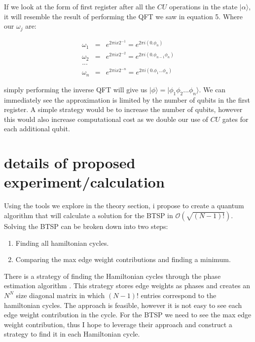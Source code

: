 \documentclass[twocolumn,showpacs,preprintnumbers,amsmath,amssymb]{revtex4}
\begin{document}
		If we look at the form of first register after all the $CU$ operations in the state $|\alpha\rangle$, it will resemble the result of performing the QFT we saw in equation 5. Where our $\omega_j$ are:
		
		\begin{eqnarray*}
			\omega_1 &=& e^{2\pi i x 2^{-1}} =  e^{2\pi i (0.\phi_n)}\\
			\omega_2 &=& e^{2\pi i x 2^{-2}} =  e^{2\pi i (0.\phi_{n-1}\phi_n)}\\
			...\\
			\omega_n &=& e^{2\pi i x 2^{-n}} =  e^{2\pi i (0.\phi_1...\phi_n)}
		\end{eqnarray*}
		
		simply performing the inverse QFT will give us $|\phi\rangle =  |\phi_1\phi_2 ... \phi_n\rangle$.  We can immediately see the approximation is limited by the number of qubits in the first register. A simple strategy would be to increase the number of qubits, however this would also increase computational cost as we double our use of $CU$ gates for each additional qubit.
		
		
		
		
		
		
		\section{details of proposed experiment/calculation}
		
		
		Using the tools we explore in the theory section, i propose to create a quantum algorithm that will calculate a solution for the BTSP in $\mathcal{O}(\sqrt{(N-1)!})$. Solving the BTSP can be broken down into two steps:
		
		\begin{enumerate}
			\item Finding all hamiltonian cycles.
			\item Comparing the max edge weight contributions and finding a minimum.
		\end{enumerate}
		
		There is a strategy of finding the Hamiltonian cycles through the phase estimation algorithm \cite{srinivasan2018efficient}. This strategy stores edge weights as phases and creates an $N^N$ size diagonal matrix in which $(N-1)!$ entries correspond to the hamiltonian cycles. The approach is feasible, however it is not easy to see each edge weight contribution in the cycle. For the BTSP we need to see the max edge weight contribution, thus I hope to leverage their approach and construct a strategy to find it in each Hamiltonian cycle.
		
\end{document}
